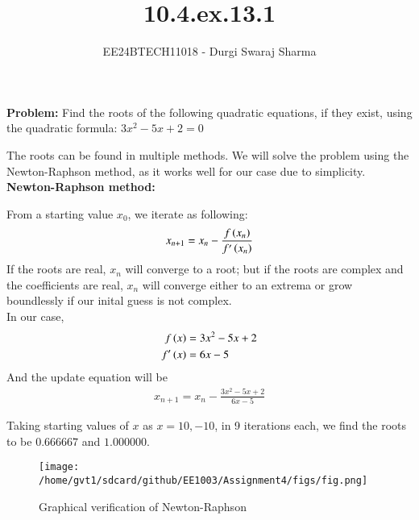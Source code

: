 \documentclass[journal]{IEEEtran}
\begin{document}

\vspace{3cm}

\title{10.4.ex.13.1}
\author{EE24BTECH11018 - Durgi Swaraj Sharma}

{\let\newpage\relax\maketitle}
\renewcommand{\thefigure}{\theenumi}
\renewcommand{\thetable}{\theenumi}
\setlength{\intextsep}{10pt}
\renewcommand{\thetable}{\theenumi}
\textbf{Problem:} Find the roots of the following quadratic equations, if they exist, using the quadratic formula:
 $3x^2-5x+2=0$ 
\solution 

The roots can be found in multiple methods. We will solve the problem using the Newton-Raphson method, as it works well for our case due to simplicity.\\ 
\textbf{Newton-Raphson method:}

From a starting value $x_0$, we iterate as following:
\begin{align}
  x_{n+1} = x_n - \frac{f\left(x_n\right)}{f^{\prime}\left(x_n\right)}
\end{align}
If the roots are real, $x_n$ will converge to a root; but if the roots are complex and the coefficients are real, $x_n$ will converge either to an extrema or grow boundlessly if our inital guess is not complex. \\In our case,
\begin{align}
  f\left(x\right) &= 3x^2-5x+2\\
  f^{\prime}\left(x\right) &= 6x-5
\end{align}
And the update equation will be
\begin{align}
  x_{n+1} = x_n - \frac{3x^2-5x+2}{6x-5}
\end{align}

Taking starting values of $x$ as $x = 10, -10$, in 9 iterations each, we find the roots to be $0.666667$ and $1.000000$. 

\begin{figure}
  \centering
  \texttt{[image: /home/gvt1/sdcard/github/EE1003/Assignment4/figs/fig.png]}
  \caption{Graphical verification of Newton-Raphson}
\end{figure}
\end{document}
